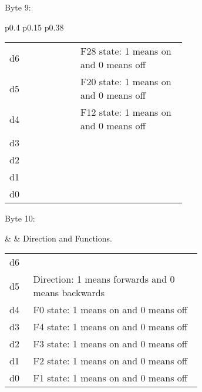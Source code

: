 Byte 9:

\begin{tabular}{p{0.4\linewidth} p{0.15\linewidth} p{0.38\linewidth}} 

\begin{tabular}{|p{0.3cm}|p{0.3cm}|p{0.3cm}|p{0.3cm}|p{0.3cm}|p{0.3cm}|p{0.3cm}|p{0.3cm}|}
\hline
0 & d6 & d5 & d4 & d3 & d2 & d1 & d0\\
\hline
\end{tabular}
&  & Functions.\\
\end{tabular}

\begin{tabular}{p{0.05\linewidth} p{0.6\linewidth}} 
d6 & F28 state: 1 means on and 0 means off\\
d5 & F20 state: 1 means on and 0 means off\\
d4 & F12 state: 1 means on and 0 means off\\
d3 & \\
d2 & \\
d1 & \\
d0 & \\
\end{tabular}

Byte 10:

&  & Direction and Functions.\\
\end{tabular}

\begin{tabular}{p{0.05\linewidth} p{0.6\linewidth}} 
d6 & \\
d5 & Direction: 1 means forwards and 0 means backwards\\
d4 & F0 state: 1 means on and 0 means off\\
d3 & F4 state: 1 means on and 0 means off\\
d2 & F3 state: 1 means on and 0 means off\\
d1 & F2 state: 1 means on and 0 means off\\
d0 & F1 state: 1 means on and 0 means off\\
\end{tabular}

